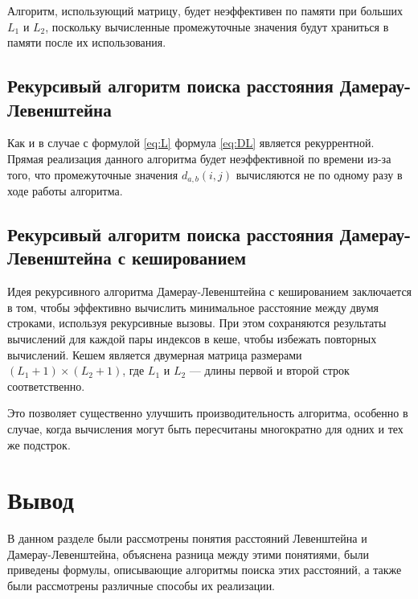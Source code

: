 Алгоритм, использующий матрицу, будет неэффективен по памяти при больших $L_1$ и $L_2$, поскольку вычисленные промежуточные значения будут храниться в памяти после их использования.

\subsection{Рекурсивый алгоритм поиска расстояния Дамерау-Левенштейна}

Как и в случае с формулой \ref{eq:L}  формула \ref{eq:DL} является рекуррентной. Прямая реализация данного алгоритма будет неэффективной по времени из-за того, что промежуточные значения $d_{a,b}(i,j)$ вычисляются не по одному разу в ходе работы алгоритма.

\subsection{Рекурсивый алгоритм поиска расстояния Дамерау-Левенштейна с кешированием}

Идея рекурсивного алгоритма Дамерау-Левенштейна с кешированием заключается в том, чтобы эффективно вычислить минимальное расстояние между двумя строками, используя рекурсивные вызовы. При этом сохраняются результаты вычислений для каждой пары индексов в кеше, чтобы избежать повторных вычислений. Кешем является двумерная матрица размерами $(L_1 + 1) \times (L_2 + 1)$, где $L_1$ и $L_2$ --- длины первой и второй строк соответственно.

Это позволяет существенно улучшить производительность алгоритма, особенно в случае, когда вычисления могут быть пересчитаны многократно для одних и тех же подстрок.

\section*{Вывод}

В данном разделе были рассмотрены понятия расстояний Левенштейна и Дамерау-Левенштейна, объяснена разница между этими понятиями, были приведены формулы, описывающие алгоритмы поиска этих расстояний, а также были рассмотрены различные способы их реализации.
